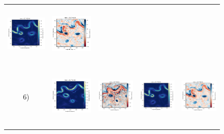 \documentclass[draft]{agujournal2019}
\begin{document}
\begin{figure}[H]
\begin{center}
\begin{tabular}{ccccc}
\includegraphics[trim={13mm 13mm 22mm 5mm},clip, width=2.9cm,height=2.9cm]{figures/plots/enatl60-t_rec_ke.png} &
\includegraphics[trim={13mm 13mm 22mm 5mm},clip,width=2.9cm,height=2.9cm]{figures/plots/enatl60-t_rec_vort_r.png} \\
\hspace{-10mm} 6) &
 \includegraphics[trim={0 0 19mm 5mm},clip, width=3.3cm,height=3.1cm]{figures/plots/enatl60-0_train_ke.png} &
 \includegraphics[trim={13mm 0 22mm 5mm},clip, width=2.9cm,height=3.1cm]{figures/plots/enatl60-0_train_vort_r.png} &
 \includegraphics[trim={13mm 0 22mm 5mm},clip, width=2.9cm,height=3.1cm]{figures/plots/enatl60-0_rec_ke.png} &
 \includegraphics[trim={13mm 0 22mm 5mm},clip,width=2.9cm,height=3.1cm]{figures/plots/enatl60-0_rec_vort_r.png} \\

\end{tabular}
\end{center}
\end{figure}
\end{document}
